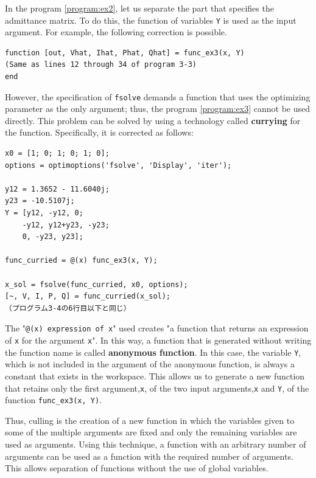 \documentclass[tombow,dvipdfmx]{corona-a5-1.1}
\begin{document}
\begin{例}
In the program \nobreak\ref{program:ex2}, let us separate the part that specifies the admittance matrix.
To do this, the function of variables \verb|Y| is used as the input argument.
For example, the following correction is possible.

\smallskip
\begin{PROGRAMA}[count, title={func\_ex3.m}]\label{program:ex3}
\begin{verbatim}
function [out, Vhat, Ihat, Phat, Qhat] = func_ex3(x, Y)
(Same as lines 12 through 34 of program 3-3)
end
\end{verbatim}
\end{PROGRAMA}

However, the specification of \verb|fsolve| demands a function that uses the optimizing parameter as the only argument; thus, the program \ref{program:ex3} cannot be used directly.
This problem can be solved by using a technology called \textbf{currying} for the function.
Specifically, it is corrected as follows:

\smallskip
\begin{PROGRAMA}[count,title={main\_ex3.m}]\label{program:ex3_main}
\begin{verbatim}
x0 = [1; 0; 1; 0; 1; 0];
options = optimoptions('fsolve', 'Display', 'iter');

y12 = 1.3652 - 11.6040j;
y23 = -10.5107j;
Y = [y12, -y12, 0;
    -y12, y12+y23, -y23;
    0, -y23, y23];

func_curried = @(x) func_ex3(x, Y);

x_sol = fsolve(func_curried, x0, options);
[~, V, I, P, Q] = func_curried(x_sol);
（プログラム3-4の6行目以下と同じ）
\end{verbatim}
\end{PROGRAMA}

The "\verb|@(x) expression of x|" used creates "a function that returns an expression of \verb|x| for the argument \verb|x|".
In this way, a function that is generated without writing the function name is called \textbf{anonymous function}.
In this case, the variable \verb|Y|, which is not included in the argument of the anonymous function, is always a constant that exists in the workspace.
This allows us to generate a new function that retains only the first argument,\verb|x|, of the two input arguments,\verb|x| and \verb|Y|, of the function \verb|func_ex3(x, Y)|.


Thus, culling is the creation of a new function in which the variables given to some of the multiple arguments are fixed and only the remaining variables are used as arguments.
Using this technique, a function with an arbitrary number of arguments can be used as a function with the required number of arguments.
This allows separation of functions without the use of global variables.

\end{例}
\end{document}
